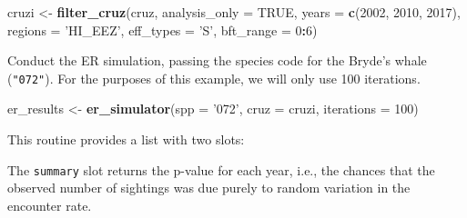 \documentclass[
]{book}
\newenvironment{Shaded}{\begin{snugshade}}{\end{snugshade}}
\newcommand{\DataTypeTok}[1]{\textcolor[rgb]{0.13,0.29,0.53}{#1}}
\newcommand{\DecValTok}[1]{\textcolor[rgb]{0.00,0.00,0.81}{#1}}
\newcommand{\FloatTok}[1]{\textcolor[rgb]{0.00,0.00,0.81}{#1}}
\newcommand{\KeywordTok}[1]{\textcolor[rgb]{0.13,0.29,0.53}{\textbf{#1}}}
\newcommand{\NormalTok}[1]{#1}
\newcommand{\OperatorTok}[1]{\textcolor[rgb]{0.81,0.36,0.00}{\textbf{#1}}}
\newcommand{\OtherTok}[1]{\textcolor[rgb]{0.56,0.35,0.01}{#1}}
\newcommand{\StringTok}[1]{\textcolor[rgb]{0.31,0.60,0.02}{#1}}
\begin{document}
\begin{Shaded}
\begin{Highlighting}[]
\NormalTok{cruzi <-}\StringTok{ }
\StringTok{  }\KeywordTok{filter_cruz}\NormalTok{(cruz,}
              \DataTypeTok{analysis_only =} \OtherTok{TRUE}\NormalTok{,}
              \DataTypeTok{years =} \KeywordTok{c}\NormalTok{(}\DecValTok{2002}\NormalTok{, }\DecValTok{2010}\NormalTok{, }\DecValTok{2017}\NormalTok{),}
              \DataTypeTok{regions =} \StringTok{'HI_EEZ'}\NormalTok{,}
              \DataTypeTok{eff_types =} \StringTok{'S'}\NormalTok{,}
              \DataTypeTok{bft_range =} \DecValTok{0}\OperatorTok{:}\DecValTok{6}\NormalTok{)}
\end{Highlighting}
\end{Shaded}

Conduct the ER simulation, passing the species code for the Bryde's whale (\texttt{"072"}). For the purposes of this example, we will only use 100 iterations.

\begin{Shaded}
\begin{Highlighting}[]
\NormalTok{er_results <-}\StringTok{ }
\StringTok{  }\KeywordTok{er_simulator}\NormalTok{(}\DataTypeTok{spp =} \StringTok{'072'}\NormalTok{, }\DataTypeTok{cruz =}\NormalTok{ cruzi, }\DataTypeTok{iterations =} \DecValTok{100}\NormalTok{)}
\end{Highlighting}
\end{Shaded}

This routine provides a list with two slots:

\begin{Shaded}
\end{Shaded}

The \texttt{summary} slot returns the p-value for each year, i.e., the chances that the observed number of sightings was due purely to random variation in the encounter rate.

\begin{Shaded}
\end{Shaded}
\end{document}
